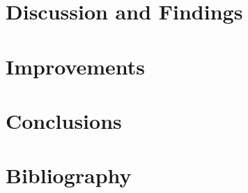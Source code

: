 \section{Discussion and Findings}\label{discussion-and-findings}

\section{Improvements}\label{improvements}

\section{Conclusions}\label{conclusions}

\section*{Bibliography}\label{bibliography}
